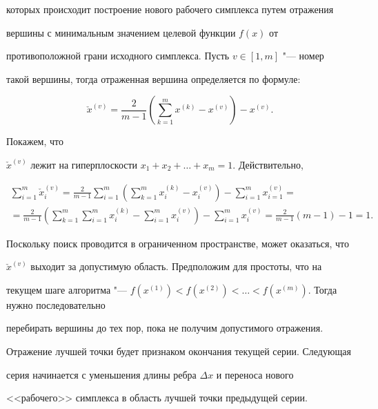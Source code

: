 которых происходит построение нового рабочего симплекса путем отражения

вершины с минимальным значением целевой функции $f(x)$ от

противоположной грани исходного симплекса. Пусть $v\in [1,m]$ "--- номер

такой вершины, тогда отраженная вершина определяется по формуле:

\[

\check{x}^{(v)}=\frac{2}{m-1}\left( \sum\limits_{k=1}^m x^{(k)} -x^{(v)} \right)-x^{(v)}.

\]



Покажем, что

$\check{x}^{(v)}$ лежит на гиперплоскости $x_1 +x_2 +\ldots+x_m =1$. Действительно,

\begin{multline*}

\sum\limits_{i=1}^m

\check {x}_i^{(v)} = \frac{2}{m-1}\sum\limits_{i=1}^m \left( \sum\limits_{k=1}^m

x_i^{(k)} -x_i^{(v)}  \right) - \sum\limits_{i=1}^m x_{i=1}^{(v)} = \\

=\frac{2}{m-1}\left( \sum\limits_{k=1}^m \sum\limits_{i=1}^m x_i^{(k)}

-\sum\limits_{i=1}^m x_i^{(v)} \right)-\sum\limits_{i=1}^m

x_i^{(v)} =

\frac{2}{m-1}( m-1)-1=1.

\end{multline*}



Поскольку поиск проводится в ограниченном пространстве, может оказаться, что

$\check {x}^{(v)}$ выходит за допустимую область. Предположим для простоты, что на

текущем шаге алгоритма "--- $f\left( x^{(1)}\right)<f\left( x^{(2)}\right)<\ldots<f\left( x^{(m)} \right)$. Тогда нужно последовательно

перебирать вершины до тех пор, пока не получим допустимого отражения.

Отражение лучшей точки будет признаком окончания текущей серии. Следующая

серия начинается с уменьшения длины ребра $\Delta x$ и переноса нового

<<рабочего>> симплекса в область лучшей точки предыдущей серии.



